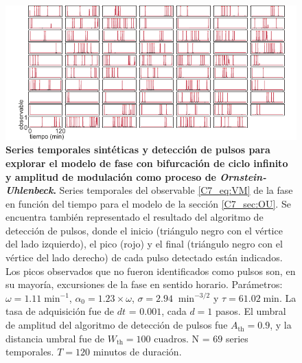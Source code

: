 \documentclass[./main.tex]{subfiles}
\begin{document}
\begin{subappendices}
\begin{figure}
    \centering
    \includegraphics[width=1\columnwidth]{figures/chapter7/C7_OU_traces_for_evaluation_VM.pdf} 
    \caption{\textbf{Series temporales sintéticas y detección de pulsos para explorar el modelo de fase con bifurcación de ciclo infinito y amplitud de modulación como proceso de \textit{Ornstein-Uhlenbeck}.} Series temporales del observable \ref{C7_eq:VM} de la fase en función del tiempo para el modelo de la sección \ref{C7_sec:OU}. Se encuentra también representado el resultado del algoritmo de detección de pulsos, donde el inicio (triángulo negro con el vértice del lado izquierdo), el pico (rojo) y el final (triángulo negro con el vértice del lado derecho) de cada pulso detectado están indicados. Los picos observados que no fueron identificados como pulsos son, en su mayoría, excursiones de la fase en sentido horario. Parámetros: $\omega = 1.11\;\text{min}^{-1}$, $\alpha_0 = 1.23 \times \omega$, $ \sigma = 2.94 \; \;\text{min}^{-3/2}$ y $\tau = 61.02 \; \text{min} $. La tasa de adquisición fue de $dt$ = $0.001$, cada $d = 1$ pasos. El umbral de amplitud del algoritmo de detección de pulsos fue $A_{\text{th}} = 0.9$, y la distancia umbral fue de $W_{\text{th}} = 100\text{ cuadros}$. N = $69$ series temporales. $T = 120$ minutos de duración.}
    \label{C7_fig:OU_traces_VM}
\end{figure}


\end{subappendices}
\end{document}
